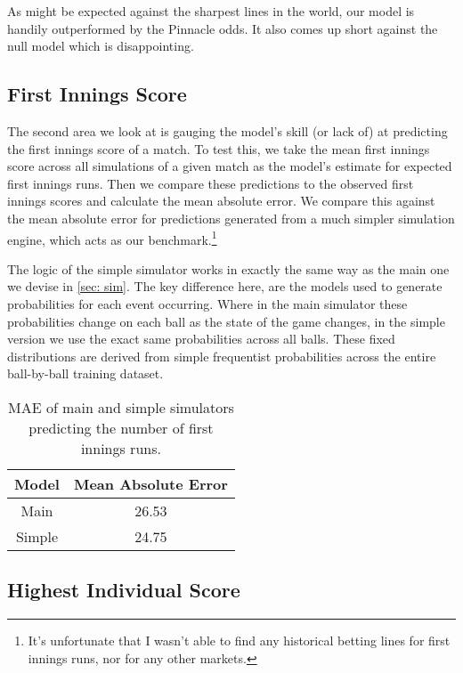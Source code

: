 As might be expected against the sharpest lines in the world, our model is handily outperformed by the Pinnacle odds. It also comes up short against the null model which is disappointing.

\subsection{First Innings Score}

The second area we look at is gauging the model's skill (or lack of) at predicting the first innings score of a match. To test this, we take the mean first innings score across all simulations of a given match as the model's estimate for expected first innings runs. Then we compare these predictions to the observed first innings scores and calculate the mean absolute error. We compare this against the mean absolute error for predictions generated from a much simpler simulation engine, which acts as our benchmark.\footnote{It's unfortunate that I wasn't able to find any historical betting lines for first innings runs, nor for any other markets.}

The logic of the simple simulator works in exactly the same way as the main one we devise in \cref{sec: sim}. The key difference here, are the models used to generate probabilities for each event occurring. Where in the main simulator these probabilities change on each ball as the state of the game changes, in the simple version we use the exact same probabilities across all balls. These fixed distributions are derived from simple frequentist probabilities across the entire ball-by-ball training dataset.

\begin{table}[ht]
\vspace{0.5em}
\centering
\begin{tabular} {c c} \toprule
    {Model} & {Mean Absolute Error} \\ \midrule
     Main & 26.53 \\
     Simple & 24.75 \\ \bottomrule
\end{tabular}
\caption{MAE of main and simple simulators predicting the number of first innings runs.}
\label{table: fis}
\end{table}

\subsection{Highest Individual Score}

